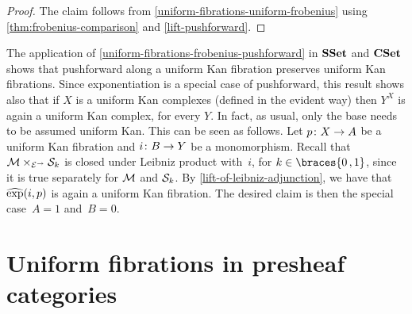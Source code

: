 \documentclass[reqno,10pt,a4paper,oneside,draft]{amsart}
\begin{document}
{{\begin{proof}
The claim follows from \cref{uniform-fibrations-uniform-frobenius} using \cref{thm:frobenius-comparison} and \cref{lift-pushforward}.
\end{proof}

\begin{example}
The application of \cref{uniform-fibrations-frobenius-pushforward} in $\SSet$ and $\CSet$ shows that pushforward along a uniform Kan fibration preserves uniform Kan fibrations.
Since exponentiation is a special case of pushforward, this result shows also that if $X$ is a uniform Kan complexes (defined in the evident way) then $Y^X$ is again a uniform Kan complex,
for every $Y$.
In fact, as usual, only the base needs to be assumed uniform Kan.
This can be seen as follows.
Let $p \co X \to A$ be a uniform Kan fibration and $i \co B \to Y$ be a monomorphism.
Recall that~$\cal{M} \times_{\cal{E}^\to} \cal{S}_k$ is closed under Leibniz product with~$i$, for $k \in \braces{0\,, 1}$, since it is true separately for $\cal{M}$ and $\cal{S}_k$.
By \cref{lift-of-leibniz-adjunction}, we have that~$\hatexp(i, p)$ is again a uniform Kan fibration.
The desired claim is then the special case~$A = 1$ and~$B = 0$.
\end{example}

\section{Uniform fibrations in presheaf categories}
\label{sec:fib-psh}

}}
\end{document}
